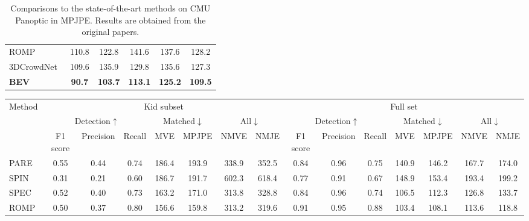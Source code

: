\documentclass[10pt,twocolumn,letterpaper]{article}
\begin{document}
\begin{table*}[t]
{\begin{tabular}{l|cccc|c}
        ROMP~\cite{romp} & 110.8 & 122.8 & 141.6 & 137.6 & 128.2\\
        3DCrowdNet~\cite{choi20223dcrowdnet} & 109.6 & 135.9 & 129.8 & 135.6 & 127.3 \\
        \textbf{BEV} & \textbf{90.7} & \textbf{103.7} & \textbf{113.1} & \textbf{125.2} & \textbf{109.5}\\
   \bottomrule
    \end{tabular}
    \vspace{-3mm}
    \caption{Comparisons to the state-of-the-art methods on CMU Panoptic in MPJPE. Results are obtained from the original papers.}  \label{tab:CMU Panoptic}}
\end{table*}\vspace{-3mm}


\begin{table*}[t]
\setlength\tabcolsep{3pt}
	\footnotesize
	\centering
\begin{tabular}{l|ccc|cc|cc|ccc|cc|cc}
	\toprule
 \multirow{3}{*}{Method}&  \multicolumn{7}{c|}{Kid subset} & \multicolumn{7}{c}{Full set} \\
	\cline{2-15}
& \multicolumn{3}{c|}{Detection$\uparrow$} & \multicolumn{2}{c|}{Matched$\downarrow$}  &  \multicolumn{2}{c|}{All$\downarrow$} & \multicolumn{3}{c|}{Detection$\uparrow$} & \multicolumn{2}{c|}{Matched$\downarrow$}  &  \multicolumn{2}{c}{All$\downarrow$} \\
\cline{2-15}
&  \multicolumn{1}{c}{F1 score} & \multicolumn{1}{c}{Precision} & \multicolumn{1}{c|}{Recall} & \multicolumn{1}{c}{MVE} & \multicolumn{1}{c|}{MPJPE} & \multicolumn{1}{c}{NMVE} & \multicolumn{1}{c|}{NMJE} &  \multicolumn{1}{c}{F1 score} & \multicolumn{1}{c}{Precision} & \multicolumn{1}{c|}{Recall} & \multicolumn{1}{c}{MVE} & \multicolumn{1}{c|}{MPJPE} & \multicolumn{1}{c}{NMVE} & \multicolumn{1}{c}{NMJE} \\
\midrule
PARE~\cite{kocabas2021pare}& 0.55 & 0.44 & 0.74 & 186.4 & 193.9 & 338.9 & 352.5 & 0.84 & 0.96 & 0.75 & 140.9 & 146.2 & 167.7 & 174.0\\
SPIN~\cite{patel2021agora}& 0.31 & 0.21 & 0.60 & 186.7 & 191.7 & 602.3 & 618.4 & 0.77 & 0.91 & 0.67 & 148.9 & 153.4 & 193.4 & 199.2\\
SPEC~\cite{Kocabas_SPEC_2021} & 0.52 & 0.40 & 0.73 & 163.2 & 171.0 & 313.8 & 328.8 & 0.84 & 0.96 & 0.74 & 106.5 & 112.3 & 126.8 & 133.7 \\
ROMP~\cite{romp} & 0.50 & 0.37 & 0.80 & 156.6 & 159.8 & 313.2& 319.6 & 0.91 & 0.95 & 0.88 & 103.4 & 108.1 & 113.6 & 118.8\\

\end{tabular}
\end{table*}
\end{document}
